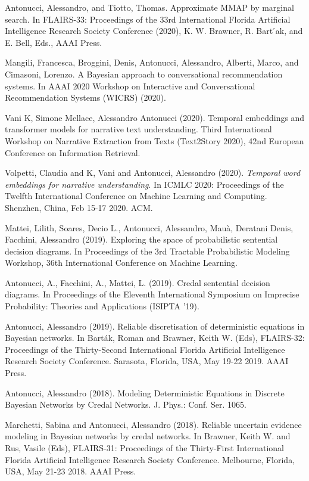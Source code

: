 \begin{cventries}
\begin{cvitems}
\item Antonucci, Alessandro, and Tiotto, Thomas. Approximate MMAP by marginal search. In FLAIRS-33: Proceedings of the 33rd International Florida Artificial Intelligence Research Society Conference (2020), K. W. Brawner, R. Bart ́ak, and E. Bell, Eds., AAAI Press.
\item Mangili, Francesca, Broggini, Denis, Antonucci, Alessandro, Alberti, Marco, and Cimasoni, Lorenzo. A Bayesian approach to conversational recommendation systems. In AAAI 2020 Workshop on Interactive and Conversational Recommendation Systems (WICRS) (2020).
\item Vani K, Simone Mellace, Alessandro Antonucci (2020). Temporal embeddings and transformer models for narrative text understanding. Third International Workshop on Narrative Extraction from Texts (Text2Story 2020), 42nd European Conference on Information Retrieval.
\item Volpetti, Claudia and K, Vani and Antonucci, Alessandro (2020). \emph{Temporal word embeddings for narrative understanding}. In ICMLC 2020: Proceedings of the Twelfth International Conference on Machine Learning and Computing.   Shenzhen, China,   Feb 15-17 2020.   ACM.
\item Mattei, Lilith, Soares, Decio L., Antonucci, Alessandro, Mauà, Deratani Denis, Facchini, Alessandro (2019). Exploring the space of probabilistic sentential decision diagrams. In Proceedings of the 3rd Tractable Probabilistic Modeling Workshop, 36th International Conference on Machine Learning.
\item Antonucci, A., Facchini, A., Mattei, L. (2019). Credal sentential decision diagrams. In Proceedings of the Eleventh International Symposium on Imprecise Probability: Theories and Applications (ISIPTA '19).
\item Antonucci, Alessandro (2019).   Reliable discretisation of deterministic equations in Bayesian networks.   In Barták, Roman and Brawner, Keith W. (Eds), FLAIRS-32: Proceedings of the Thirty-Second International Florida Artificial Intelligence Research Society Conference.   Sarasota, Florida, USA,   May 19-22 2019.   AAAI Press.
\item Antonucci, Alessandro (2018).   Modeling Deterministic Equations in Discrete Bayesian Networks by Credal Networks.   J. Phys.: Conf. Ser. 1065.
\item Marchetti, Sabina and Antonucci, Alessandro (2018).   Reliable uncertain evidence modeling in Bayesian networks by credal networks.   In Brawner, Keith W. and Rus, Vasile (Eds), FLAIRS-31: Proceedings of the Thirty-First International Florida Artificial Intelligence Research Society Conference.   Melbourne, Florida, USA,   May 21-23 2018.   AAAI Press.

\end{cvitems}
\end{cventries}
